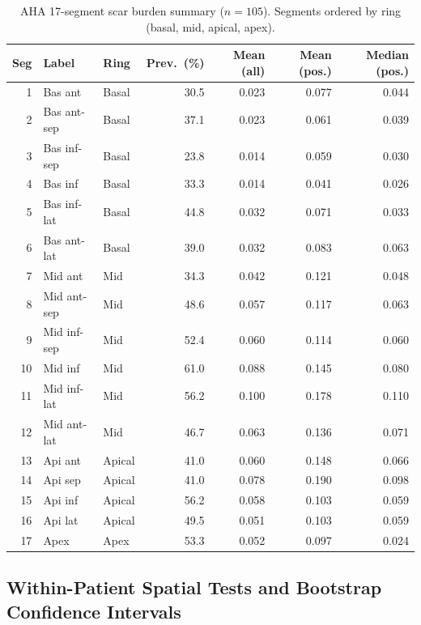 \begin{table}[htbp]
    \centering
    \caption{AHA 17-segment scar burden summary ($n=105$). Segments ordered by ring (basal, mid, apical, apex).}
    \label{tab:aha17summary}
    \small
    \begin{tabular}{rllrrrr}
        \toprule
        Seg & Label & Ring & Prev.\ (\%) & Mean (all) & Mean (pos.) & Median (pos.) \\
        \midrule
        1  & Bas ant      & Basal & 30.5 & 0.023 & 0.077 & 0.044 \\
        2  & Bas ant-sep  & Basal & 37.1 & 0.023 & 0.061 & 0.039 \\
        3  & Bas inf-sep  & Basal & 23.8 & 0.014 & 0.059 & 0.030 \\
        4  & Bas inf      & Basal & 33.3 & 0.014 & 0.041 & 0.026 \\
        5  & Bas inf-lat  & Basal & 44.8 & 0.032 & 0.071 & 0.033 \\
        6  & Bas ant-lat  & Basal & 39.0 & 0.032 & 0.083 & 0.063 \\
        \midrule
        7  & Mid ant      & Mid   & 34.3 & 0.042 & 0.121 & 0.048 \\
        8  & Mid ant-sep  & Mid   & 48.6 & 0.057 & 0.117 & 0.063 \\
        9  & Mid inf-sep  & Mid   & 52.4 & 0.060 & 0.114 & 0.060 \\
        10 & Mid inf      & Mid   & 61.0 & 0.088 & 0.145 & 0.080 \\
        11 & Mid inf-lat  & Mid   & 56.2 & 0.100 & 0.178 & 0.110 \\
        12 & Mid ant-lat  & Mid   & 46.7 & 0.063 & 0.136 & 0.071 \\
        \midrule
        13 & Api ant      & Apical & 41.0 & 0.060 & 0.148 & 0.066 \\
        14 & Api sep      & Apical & 41.0 & 0.078 & 0.190 & 0.098 \\
        15 & Api inf      & Apical & 56.2 & 0.058 & 0.103 & 0.059 \\
        16 & Api lat      & Apical & 49.5 & 0.051 & 0.103 & 0.059 \\
        \midrule
        17 & Apex         & Apex  & 53.3 & 0.052 & 0.097 & 0.024 \\
        \bottomrule
    \end{tabular}
\end{table}

\subsection{Within-Patient Spatial Tests and Bootstrap Confidence Intervals}

